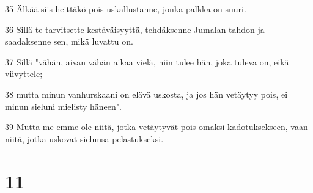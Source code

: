 \par 35 Älkää siis heittäkö pois uskallustanne, jonka palkka on suuri.
\par 36 Sillä te tarvitsette kestäväisyyttä, tehdäksenne Jumalan tahdon ja saadaksenne sen, mikä luvattu on.
\par 37 Sillä "vähän, aivan vähän aikaa vielä, niin tulee hän, joka tuleva on, eikä viivyttele;
\par 38 mutta minun vanhurskaani on elävä uskosta, ja jos hän vetäytyy pois, ei minun sieluni mielisty häneen".
\par 39 Mutta me emme ole niitä, jotka vetäytyvät pois omaksi kadotuksekseen, vaan niitä, jotka uskovat sielunsa pelastukseksi.

\chapter{11}

